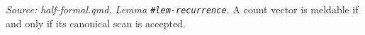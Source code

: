 \begin{theorem}
  \label{thm:meldable_iff_scan}
  \textit{Source: half-formal.qmd, Lemma \texttt{\#lem-recurrence}.}
  A count vector is meldable if and only if its canonical scan is
  accepted.
\end{theorem}
